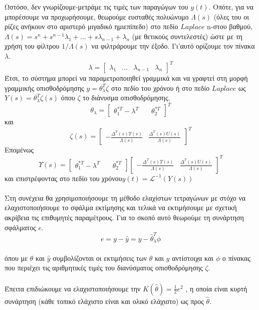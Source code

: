 \documentclass[12pt]{article}
\newcommand{\Lagr}{\mathcal{L}}
\begin{document}
Ωστόσο, δεν γνωρίζουμε-μετράμε τις τιμές των παραγώγων του $y(t)$. Οπότε, για να μπορέσουμε να προχωρήσουμε, θεωρούμε ευσταθές πολυώνυμο $\Lambda(s)$  (όλες του οι ρίζες ανήκουν στο αριστερό μιγαδικό ημιεπίπεδο) στο πεδίο $Laplace$ n-στου βαθμού, \quad $\Lambda(s)=s^{n}+s^{n-1}\lambda_1+...+s\lambda_{n-1}+\lambda_n$ \quad (με θετικούς συντελεστές) ώστε με τη χρήση του φίλτρου $1/\Lambda(s)$ να φιλτράρουμε την έξοδο. Γι'αυτό ορίζουμε τον πίνακα $\lambda$.
\[ \lambda= \begin{bmatrix}
\lambda_1 & ... & \lambda_{n-1} & \lambda_n
\end{bmatrix}^{T} \]
Έτσι, το σύστημα μπορεί να παραμετροποιηθεί γραμμικά και να γραφτεί στη μορφή γραμμικής οπισθοδρόμησης \quad  $y=\theta^{T}_{\lambda}\zeta$ \quad  στο πεδίο του χρόνου ή στο πεδίο $Laplace$ ως \quad $Y(s)=\theta^{T}_{\lambda}\zeta(s)$ \quad όπου $\zeta$ το διάνυσμα οπισθοδρόμησης.
\[\theta_{\lambda}=\begin{bmatrix}
		\theta_{1}^{*T}-\lambda^{Τ} \quad& \theta_{2}^{*T}
\end{bmatrix}^{T}\]
και
\[
\zeta(s)=\begin{bmatrix}
		-\frac{\Delta^{T}(s)Υ(s)}{\Lambda(s)} & \frac{\Delta^{T}(s)U(s)}{\Lambda(s)}
\end{bmatrix}^{T} \]
Επομένως \quad 
\[Υ(s)=
\begin{bmatrix}
		\theta_{1}^{*T}-\lambda^{Τ} \quad& \theta_{2}^{*T}
\end{bmatrix}
\begin{bmatrix}
		-\frac{\Delta^{T}(s)Υ(s)}{\Lambda(s)} & \frac{\Delta^{T}(s)U(s)}{\Lambda(s)}
\end{bmatrix}^{T} \]
και επιστρέφοντας στο πεδίο του χρόνου\quad $y(t)=\Lagr^{-1}(Y(s))$ 
\\ \\
Στη συνέχεια θα χρησιμοποιήσουμε τη μέθοδο ελαχίστων τετραγώνων με στόχο να ελαχιστοποιήσουμε το σφάλμα εκτίμησης και τελικά να εκτιμήσουμε με σχετική ακρίβεια τις επιθυμητές παραμέτρους. Για το σκοπό αυτό θεωρούμε τη συνάρτηση σφάλματος $e$.
\\
\[e=y-\hat{y}=y-\hat{\theta}^{T}_{\lambda}\phi\]
\\
 όπου με $\hat{\theta}$ και $\hat{y}$ συμβολίζονται οι εκτιμήσεις των $\theta$ και $y$ αντίστοιχα και $\phi$ ο πίνακας που περιέχει τις αριθμητικές τιμές του διανύσματος οπισθοδρόμησης $\zeta$.
\\ \\
Έπειτα επιδιώκουμε να ελαχιστοποιήσουμε την $K(\hat{\theta})=\frac{1}{2}e^2$ , η οποία είναι κυρτή συνάρτηση (κάθε τοπικό ελάχιστο είναι και ολικό ελάχιστο) ως προς $\hat{\theta}$.
\end{document}
